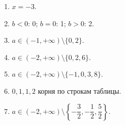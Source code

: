 \begin{resultbox}
  \begin{enumerate}
    \item \(x=-3\).
    \item \(b<0\): 0; \(b=0\): 1; \(b>0\): 2.
    \item \(a\in(-1,+\infty)\setminus\{0,2\}\).
    \item \(a\in(-2,+\infty)\setminus\{0,2,6\}\).
    \item \(a\in(-2,+\infty)\setminus\{-1,0,3,8\}\).
    \item \(0,1,1,2\) корня по строкам таблицы.
    \item \(a\in(-2,+\infty)\setminus
      \left\{-\dfrac32,-\dfrac12,\dfrac52\right\}\).
  \end{enumerate}
\end{resultbox}
